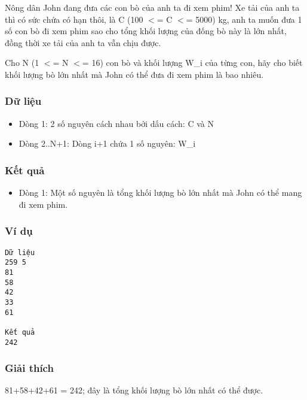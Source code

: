 



   Nông dân John đang đưa các con bò của anh ta đi xem phim! Xe tải của  anh ta thì có sức chứa có hạn thôi, là C (100 $<$= C $<$= 5000) kg, anh  ta muốn đưa 1 số con bò đi xem phim sao cho tổng khối lượng của đống  bò này là lớn nhất, đồng thời xe tải của anh ta vẫn chịu được.  

   Cho N (1 $<$= N $<$= 16) con bò và khối lượng W\_i của từng con, hãy cho  biết khối lượng bò lớn nhất mà John có thể đưa đi xem phim  là bao nhiêu.  

\subsubsection{   Dữ liệu  }
\begin{itemize}
	\item     Dòng 1: 2 số nguyên cách nhau bởi dấu cách: C và N   
	\item     Dòng 2..N+1: Dòng i+1 chứa 1 số nguyên: W\_i   
\end{itemize}

\subsubsection{   Kết quả  }
\begin{itemize}
	\item     Dòng 1: Một số nguyên là tổng khối lượng bò lớn nhất mà John        có thể mang đi xem phim.   
\end{itemize}

\subsubsection{   Ví dụ  }
\begin{verbatim}
Dữ liệu
259 5
81
58
42
33
61

Kết quả
242
\end{verbatim}

\subsubsection{   Giải thích  }

   81+58+42+61 = 242; đây là tổng khối lượng bò lớn nhất có thể được.  